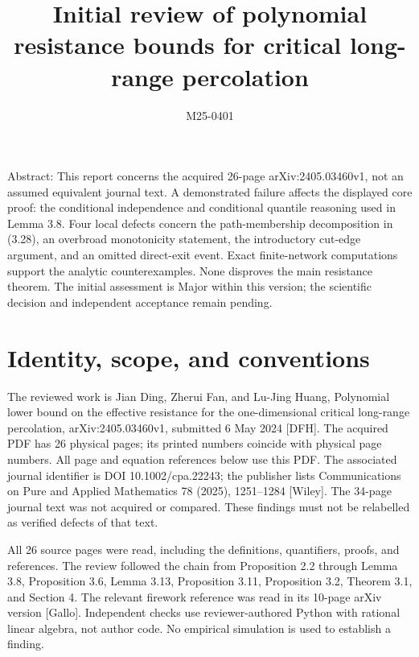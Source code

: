 \documentclass[10pt]{article}
\title{Initial review of polynomial resistance bounds
for critical long-range percolation}
\author{M25-0401}
\date{}
\begin{document}
\maketitle
Abstract: This report concerns the acquired 26-page arXiv:2405.03460v1, not an assumed equivalent journal text. A demonstrated failure affects the displayed core proof: the conditional independence and conditional quantile reasoning used in Lemma 3.8. Four local defects concern the path-membership decomposition in (3.28), an overbroad monotonicity statement, the introductory cut-edge argument, and an omitted direct-exit event. Exact finite-network computations support the analytic counterexamples. None disproves the main resistance theorem. The initial assessment is Major within this version; the scientific decision and independent acceptance remain pending.\par
\section*{Identity, scope, and conventions}
The reviewed work is Jian Ding, Zherui Fan, and Lu-Jing Huang, Polynomial lower bound on the effective resistance for the one-dimensional critical long-range percolation, arXiv:2405.03460v1, submitted 6 May 2024 [DFH]. The acquired PDF has 26 physical pages; its printed numbers coincide with physical page numbers. All page and equation references below use this PDF. The associated journal identifier is DOI 10.1002/cpa.22243; the publisher lists Communications on Pure and Applied Mathematics 78 (2025), 1251–1284 [Wiley]. The 34-page journal text was not acquired or compared. These findings must not be relabelled as verified defects of that text.\par
All 26 source pages were read, including the definitions, quantifiers, proofs, and references. The review followed the chain from Proposition 2.2 through Lemma 3.8, Proposition 3.6, Lemma 3.13, Proposition 3.11, Proposition 3.2, Theorem 3.1, and Section 4. The relevant firework reference was read in its 10-page arXiv version [Gallo]. Independent checks use reviewer-authored Python with rational linear algebra, not author code. No empirical simulation is used to establish a finding.\par
\end{document}
